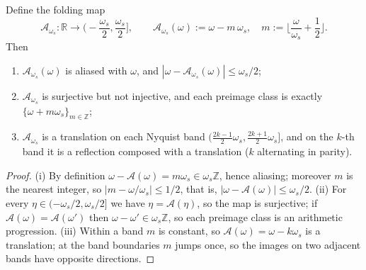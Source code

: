 \begin{proposition}\label{prop:aliasing_frequency_map_parallel}
Define the folding map
\[
\mathcal{A}_{\omega_s}:\mathbb{R}\to\Big(-\frac{\omega_s}{2},\frac{\omega_s}{2}\Big],\qquad
\mathcal{A}_{\omega_s}(\omega):=\omega-m\,\omega_s,
\quad m:=\Big\lfloor\frac{\omega}{\omega_s}+\frac12\Big\rfloor .
\]
Then
\begin{enumerate}[label=(\roman*)]
    \item $\mathcal{A}_{\omega_s}(\omega)$ is aliased with $\omega$, and $|\omega-\mathcal{A}_{\omega_s}(\omega)|\le\omega_s/2$;
    \item $\mathcal{A}_{\omega_s}$ is surjective but not injective, and each preimage class is exactly $\{\omega+m\omega_s\}_{m\in\mathbb{Z}}$;
    \item $\mathcal{A}_{\omega_s}$ is a translation on each Nyquist band $\big(\tfrac{2k-1}{2}\omega_s,\tfrac{2k+1}{2}\omega_s\big]$, and on the $k$-th band it is a reflection composed with a translation ($k$ alternating in parity).
\end{enumerate}
\end{proposition}

\begin{proof}
(i) By definition $\omega-\mathcal{A}(\omega)=m\omega_s\in\omega_s\mathbb{Z}$, hence aliasing; moreover $m$ is the nearest integer, so $|m-\omega/\omega_s|\le1/2$, that is, $|\omega-\mathcal{A}(\omega)|\le\omega_s/2$. (ii) For every $\eta\in(-\omega_s/2,\omega_s/2]$ we have $\eta=\mathcal{A}(\eta)$, so the map is surjective; if $\mathcal{A}(\omega)=\mathcal{A}(\omega')$ then $\omega-\omega'\in\omega_s\mathbb{Z}$, so each preimage class is an arithmetic progression. (iii) Within a band $m$ is constant, so $\mathcal{A}(\omega)=\omega-k\omega_s$ is a translation; at the band boundaries $m$ jumps once, so the images on two adjacent bands have opposite directions.
\end{proof}

